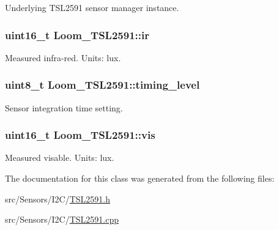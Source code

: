 Underlying T\+S\+L2591 sensor manager instance. 

\subsubsection[{\texorpdfstring{ir}{ir}}]{\setlength{\rightskip}{0pt plus 5cm}uint16\+\_\+t Loom\+\_\+\+T\+S\+L2591\+::ir\hspace{0.3cm}{\ttfamily [protected]}}\hypertarget{class_loom___t_s_l2591_a5ff1546e2339ae92ff7166e223619b1f}{}\label{class_loom___t_s_l2591_a5ff1546e2339ae92ff7166e223619b1f}


Measured infra-\/red. Units\+: lux. 

\subsubsection[{\texorpdfstring{timing\+\_\+level}{timing_level}}]{\setlength{\rightskip}{0pt plus 5cm}uint8\+\_\+t Loom\+\_\+\+T\+S\+L2591\+::timing\+\_\+level\hspace{0.3cm}{\ttfamily [protected]}}\hypertarget{class_loom___t_s_l2591_a5909e1a24e7a1f15995cc001c64c70dd}{}\label{class_loom___t_s_l2591_a5909e1a24e7a1f15995cc001c64c70dd}


Sensor integration time setting. 

\subsubsection[{\texorpdfstring{vis}{vis}}]{\setlength{\rightskip}{0pt plus 5cm}uint16\+\_\+t Loom\+\_\+\+T\+S\+L2591\+::vis\hspace{0.3cm}{\ttfamily [protected]}}\hypertarget{class_loom___t_s_l2591_a89d7af5c80c4fd1c51206e7fff0fa292}{}\label{class_loom___t_s_l2591_a89d7af5c80c4fd1c51206e7fff0fa292}


Measured visable. Units\+: lux. 



The documentation for this class was generated from the following files\+:\begin{DoxyCompactItemize}
\item 
src/\+Sensors/\+I2\+C/\hyperlink{_t_s_l2591_8h}{T\+S\+L2591.\+h}\item 
src/\+Sensors/\+I2\+C/\hyperlink{_t_s_l2591_8cpp}{T\+S\+L2591.\+cpp}\end{DoxyCompactItemize}
